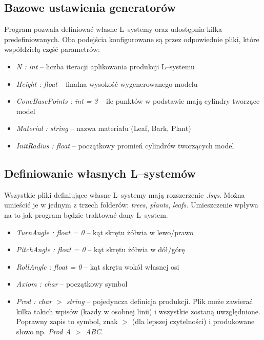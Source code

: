 \documentclass[inz,longabstract]{iithesis}
\begin{document}
        \subsection{Bazowe ustawienia generatorów}
        Program pozwala definiować własne L--systemy oraz udostępnia kilka predefiniowanych. Oba podejścia konfigurowane są przez odpowiednie pliki, które współdzielą część parametrów:
        
        \begin{itemize}
            \item \textit{N : int} -- liczba iteracji aplikowania produkcji L--systemu 
            \item \textit{Height : float} -- finalna wysokość wygenerowanego modelu
            \item \textit{ConeBasePoints : int = 3} -- ile punktów w podstawie mają cylindry tworzące model
            \item \textit{Material : string} -- nazwa materiału (Leaf, Bark, Plant)
            \item \textit{InitRadius : float} -- początkowy promień cylindrów tworzących model
        \end{itemize}
        
        \subsection{Definiowanie własnych L--systemów}
        Wszystkie pliki definiujące własne L--systemy mają rozszerzenie \textit{.lsys}. Można umieścić je w jednym z trzech folderów: \textit{trees}, \textit{plants}, \textit{leafs}. Umieszczenie wpływa na to jak program będzie traktować dany L--system.
        
        \begin{itemize}
            \item \textit{TurnAngle : float = 0} -- kąt skrętu żółwia w lewo/prawo
            \item \textit{PitchAngle : float = 0} -- kąt skrętu żółwia w dół/górę 
            \item \textit{RollAngle : float = 0} -- kąt skrętu wokół własnej osi
            \item \textit{Axiom : char} -- początkowy symbol
            \item \textit{Prod : char $>$ string } -- pojedyncza definicja produkcji. Plik może zawierać kilka takich wpisów (każdy w osobnej linii) i wszystkie zostaną uwzględnione. Poprawny zapis to symbol, znak $>$ (dla lepszej czytelności) i produkowane słowo np. \textit{Prod A $>$ ABC}. 
        \end{itemize}
        
\end{document}

